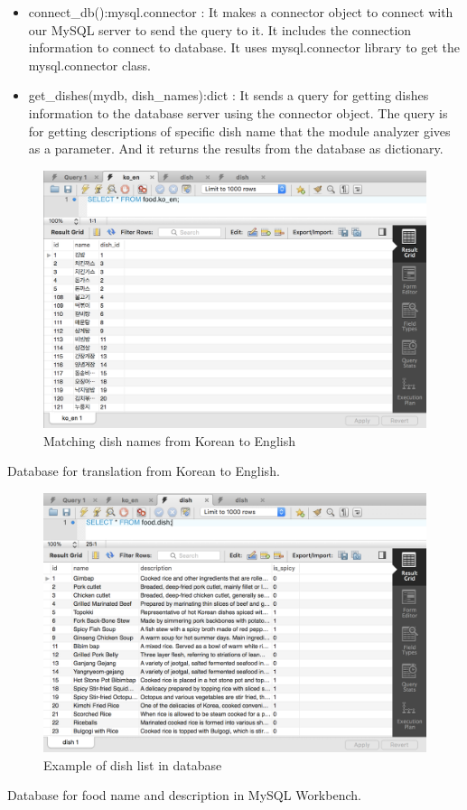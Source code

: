 \begin{itemize}
\item connect\_db():mysql.connector :  It makes a connector object to connect with our MySQL server to send the query to it. It includes the connection information to connect to database. It uses mysql.connector library to get the mysql.connector class. \newline

\item get\_dishes(mydb, dish\_names):dict : It sends a query for getting dishes information to the database server using the connector object. The query is for getting descriptions of specific dish name that the module analyzer gives as a parameter. And it returns the results from the database as dictionary. \newline
\end{itemize}

\FloatBarrier

\begin{figure}[htbp]
\centerline{\includegraphics[width=\linewidth]{./pictures/database_ko_eng}}
\caption{Matching dish names from Korean to English}
\label{fig:Matching dish names from Korean to English}
\end{figure}
\FloatBarrier
Database for translation from Korean to English.

\begin{figure}[htbp]
\centerline{\includegraphics[width=\linewidth]{./pictures/database_dish_list}}
\caption{Example of dish list in database}
\label{fig:Example of dish list in database}
\end{figure}
\FloatBarrier
Database for food name and description in MySQL Workbench.\newline\newline

